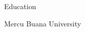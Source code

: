 \documentclass{article}
\newlength{\tabin}
\newlength{\secsep}
\newenvironment{tabbedsection}[1]{
  \begin{list}{}{
      \setlength{\itemsep}{0pt}
      \setlength{\labelsep}{0pt}
      \setlength{\labelwidth}{0pt}
      \setlength{\leftmargin}{\tabin}
      \setlength{\rightmargin}{\tabin}
      \setlength{\listparindent}{0pt}
      \setlength{\parsep}{0pt}
      \setlength{\parskip}{0pt}
      \setlength{\partopsep}{0pt}
      \setlength{\topsep}{#1}
    }
  \item[]
}{\end{list}}
\newenvironment{resume_subsection}[2][]{
  \textbf{#2} \hfill {\footnotesize #1} \hspace{2em}
  \begin{tabbedsection}{0.5\secsep}
}{\end{tabbedsection}}
\newenvironment{resume_section}[1]{
    \textbf{\Large\ruleline{\color{teal}{#1}}}
  \begin{tabbedsection}{\secsep}
}{\end{tabbedsection}}
\newcommand*\ruleline[1]{\par\noindent\raisebox{0ex}{\makebox[\linewidth]{{#1}\hspace{1ex}\hrulefill}}}
\begin{document}
  
  \begin{resume_section}{Education}
    \begin{resume_subsection}{Mercu Buana University}
    \end{resume_subsection}
    
  \end{resume_section}

  
\end{document}
